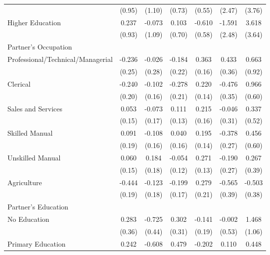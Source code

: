 \begin{longtable}{l*{6}{c}}
                    & (0.95) & (1.10) & (0.73) & (0.55) & (2.47) & (3.76) \\
\hspace{1em}Higher Education & 0.237 & -0.073 & 0.103 & -0.610 & -1.591 & 3.618 \\
                    & (0.93) & (1.09) & (0.70) & (0.58) & (2.48) & (3.64) \\
\multicolumn{7}{l}{Partner's Occupation} \\
\hspace{1em}Professional/Technical/Managerial & -0.236 & -0.026 & -0.184 & 0.363\sym{**} & 0.433 & 0.663 \\
                    & (0.25) & (0.28) & (0.22) & (0.16) & (0.36) & (0.92) \\
\hspace{1em}Clerical & -0.240 & -0.102 & -0.278 & 0.220 & -0.476 & 0.966 \\
                    & (0.20) & (0.16) & (0.21) & (0.14) & (0.35) & (0.60) \\
\hspace{1em}Sales and Services & 0.053 & -0.073 & 0.111 & 0.215 & -0.046 & 0.337 \\
                    & (0.15) & (0.17) & (0.13) & (0.16) & (0.31) & (0.52) \\
\hspace{1em}Skilled Manual & 0.091 & -0.108 & 0.040 & 0.195 & -0.378 & 0.456 \\
                    & (0.19) & (0.16) & (0.16) & (0.14) & (0.27) & (0.60) \\
\hspace{1em}Unskilled Manual & 0.060 & 0.184 & -0.054 & 0.271\sym{**} & -0.190 & 0.267 \\
                    & (0.15) & (0.18) & (0.12) & (0.13) & (0.27) & (0.39) \\
\hspace{1em}Agriculture & -0.444\sym{**} & -0.123 & -0.199 & 0.279 & -0.565 & -0.503 \\
                    & (0.19) & (0.18) & (0.17) & (0.21) & (0.39) & (0.38) \\
\multicolumn{7}{l}{Partner's Education} \\
\hspace{1em}No Education & 0.283 & -0.725 & 0.302 & -0.141 & -0.002 & 1.468 \\
                    & (0.36) & (0.44) & (0.31) & (0.19) & (0.53) & (1.06) \\
\hspace{1em}Primary Education & 0.242 & -0.608\sym{*} & 0.479 & -0.202 & 0.110 & 0.448 \\

\end{longtable}
